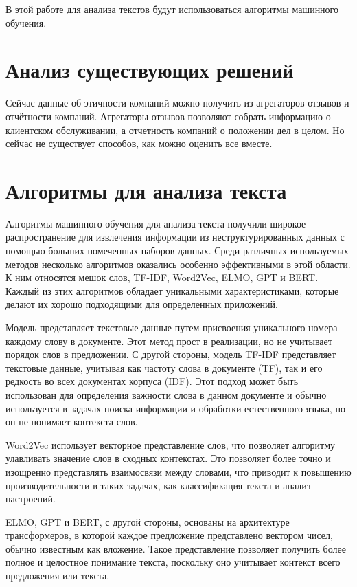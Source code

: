 \documentclass[PI, VKR]{HSEUniversity}
\begin{document}
В этой работе для анализа текстов будут использоваться алгоритмы машинного обучения.
\section{Анализ существующих решений}
\label{sec:org3d01957}
Сейчас данные об этичности компаний можно получить из агрегаторов отзывов и отчётности компаний. Агрегаторы отзывов позволяют собрать информацию о клиентском обслуживании, а отчетность компаний о положении дел в целом. Но сейчас не существует способов, как можно оценить все вместе.
\section{Алгоритмы для анализа текста}
\label{sec:org6353fc6}
Алгоритмы машинного обучения для анализа текста получили широкое распространение для извлечения информации из неструктурированных данных с помощью больших помеченных наборов данных. Среди различных используемых методов несколько алгоритмов оказались особенно эффективными в этой области. К ним относятся мешок слов\autocite{harris_distributional_1954}, TF-IDF\autocite{jones_karen_sparck_statistical_1972}, Word2Vec\autocite{mikolov_distributed_2013}, ELMO\autocite{peters_deep_2018}, GPT\autocite{radford_language_2019} и BERT\autocite{devlin_bert_2019}. Каждый из этих алгоритмов обладает уникальными характеристиками, которые делают их хорошо подходящими для определенных приложений.

Модель \label{Мешок слов} представляет текстовые данные путем присвоения уникального номера каждому слову в документе. Этот метод прост в реализации, но не учитывает порядок слов в предложении. С другой стороны, модель TF-IDF представляет текстовые данные, учитывая как частоту слова в документе (TF), так и его редкость во всех документах корпуса (IDF). Этот подход может быть использован для определения важности слова в данном документе и обычно используется в задачах поиска информации и обработки естественного языка, но он не понимает контекста слов.

Word2Vec использует векторное представление слов, что позволяет алгоритму улавливать значение слов в сходных контекстах. Это позволяет более точно и изощренно представлять взаимосвязи между словами, что приводит к повышению производительности в таких задачах, как классификация текста и анализ настроений.

ELMO, GPT и BERT, с другой стороны, основаны на архитектуре трансформеров, в которой каждое предложение представлено вектором чисел, обычно известным как вложение. Такое представление позволяет получить более полное и целостное понимание текста, поскольку оно учитывает контекст всего предложения или текста.
\end{document}
